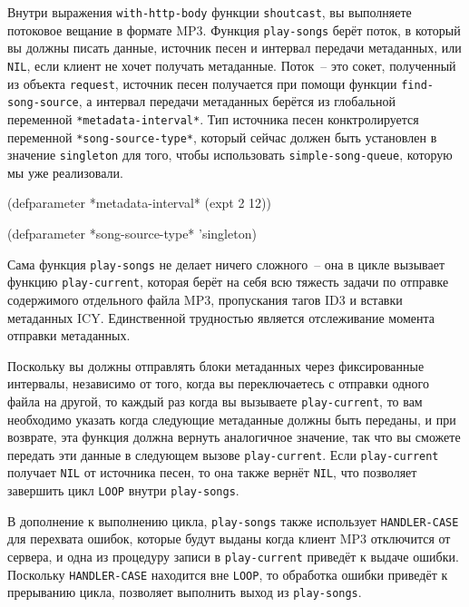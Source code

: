 Внутри выражения \lstinline{with-http-body} функции \lstinline{shoutcast}, вы выполняете потоковое
вещание в формате MP3.  Функция \lstinline{play-songs} берёт поток, в который вы должны писать
данные, источник песен и интервал передачи метаданных, или \lstinline{NIL}, если клиент не
хочет получать метаданные.  Поток~-- это сокет, полученный из объекта \lstinline{request},
источник песен получается при помощи функции \lstinline{find-song-source}, а интервал передачи
метаданных берётся из глобальной переменной \lstinline{*metadata-interval*}.  Тип источника
песен конктролируется переменной \lstinline{*song-source-type*}, который сейчас должен быть
установлен в значение \lstinline{singleton} для того, чтобы использовать
\lstinline{simple-song-queue}, которую мы уже реализовали.

\begin{myverb}
(defparameter *metadata-interval* (expt 2 12))

(defparameter *song-source-type* 'singleton)
\end{myverb}

Сама функция \lstinline{play-songs} не делает ничего сложного~-- она в цикле вызывает функцию
\lstinline{play-current}, которая берёт на себя всю тяжесть задачи по отправке содержимого
отдельного файла MP3, пропускания тагов ID3 и вставки метаданных ICY.  Единственной
трудностью является отслеживание момента отправки метаданных.

Поскольку вы должны отправлять блоки метаданных через фиксированные интервалы, независимо
от того, когда вы переключаетесь с отправки одного файла на другой, то каждый раз когда вы
вызываете \lstinline{play-current}, то вам необходимо указать когда следующие метаданные должны
быть переданы, и при возврате, эта функция должна вернуть аналогичное значение, так что вы
сможете передать эти данные в следующем вызове \lstinline{play-current}.  Если
\lstinline{play-current} получает \lstinline{NIL} от источника песен, то она также вернёт
\lstinline{NIL}, что позволяет завершить цикл \lstinline{LOOP} внутри \lstinline{play-songs}.

В дополнение к выполнению цикла, \lstinline{play-songs} также использует \lstinline{HANDLER-CASE}
для перехвата ошибок, которые будут выданы когда клиент MP3 отключится от сервера, и одна
из процедуру записи в \lstinline{play-current} приведёт к выдаче ошибки. Поскольку
\lstinline{HANDLER-CASE} находится вне \lstinline{LOOP}, то обработка ошибки приведёт к прерыванию
цикла, позволяет выполнить выход из \lstinline{play-songs}.

